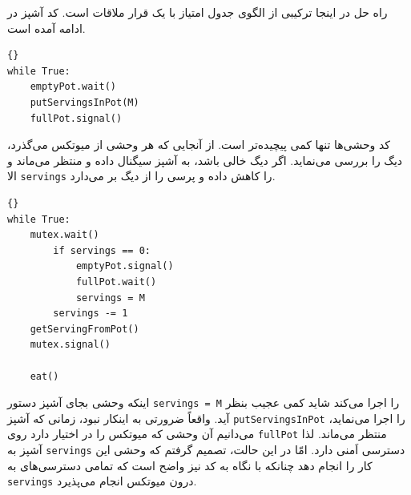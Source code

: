 \documentclass{book}
\begin{document}
    راه حل در اینجا ترکیبی از الگوی جدول امتیاز با یک قرار ملاقات است.  کد آشپز در ادامه آمده است. 

\begin{latin}
\begin{latin}
\begin{lstlisting}[title=\rl{راه‌ حل غذاخوردن وحشی‌ها (آشپز)}]{}
while True:
    emptyPot.wait()
    putServingsInPot(M)
    fullPot.signal()
\end{lstlisting}
\end{latin}
\end{latin}

    کد وحشی‌ها تنها کمی پیچیده‌تر است. از آنجایی که هر وحشی از میوتکس می‌گذرد، دیگ را بررسی می‌نماید. 
    اگر دیگ خالی باشد، به آشپز سیگنال داده و منتظر می‌ماند و الا  {\tt servings} را کاهش داده و پرسی را از دیگ بر می‌دارد. 

\begin{latin}
\begin{latin}
\begin{lstlisting}[title=\rl{راه‌ حل غذاخوردن وحشی‌ها (وحشی)}]{}
while True:
    mutex.wait()
        if servings == 0:
            emptyPot.signal()
            fullPot.wait()
            servings = M
        servings -= 1
	getServingFromPot()
    mutex.signal()

    eat()
\end{lstlisting}
\end{latin}
\end{latin}

    اینکه وحشی بجای آشپز دستور {\tt servings = M} را اجرا می‌کند شاید کمی عجیب بنظر آید. واقعاً ضرورتی به اینکار نبود، زمانی که 
    آشپز {\tt putServingsInPot} را اجرا می‌نماید، می‌دانیم آن وحشی که میوتکس را در اختیار دارد روی {\tt fullPot} منتظر می‌ماند. 
    لذا آشپز به  {\tt servings} دسترسی اَمنی دارد.  امّا در این حالت،‌ تصمیم گرفتم که وحشی این کار را انجام دهد چنانکه با نگاه به کد نیز 
    واضح است که تمامی دسترسی‌های به  {\tt servings} درون میوتکس انجام می‌پذیرد. 
    
\end{document}
